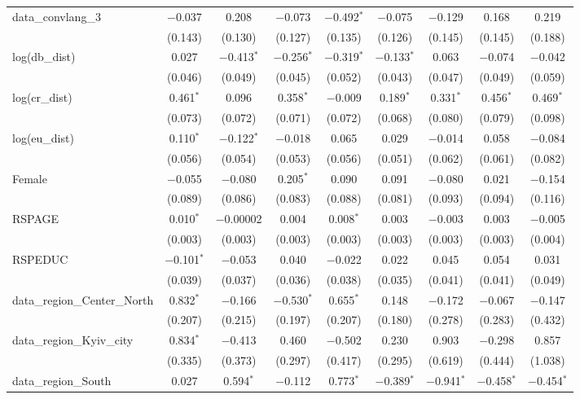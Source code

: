 \begin{table}[!htbp]
\begin{tabular}{@{\extracolsep{1pt}}lcccccccc}
  data\_convlang\_3 & $-$0.037 & 0.208 & $-$0.073 & $-$0.492$^{*}$ & $-$0.075 & $-$0.129 & 0.168 & 0.219 \\ 
  & (0.143) & (0.130) & (0.127) & (0.135) & (0.126) & (0.145) & (0.145) & (0.188) \\ 
  log(db\_dist) & 0.027 & $-$0.413$^{*}$ & $-$0.256$^{*}$ & $-$0.319$^{*}$ & $-$0.133$^{*}$ & 0.063 & $-$0.074 & $-$0.042 \\ 
  & (0.046) & (0.049) & (0.045) & (0.052) & (0.043) & (0.047) & (0.049) & (0.059) \\ 
  log(cr\_dist) & 0.461$^{*}$ & 0.096 & 0.358$^{*}$ & $-$0.009 & 0.189$^{*}$ & 0.331$^{*}$ & 0.456$^{*}$ & 0.469$^{*}$ \\ 
  & (0.073) & (0.072) & (0.071) & (0.072) & (0.068) & (0.080) & (0.079) & (0.098) \\ 
  log(eu\_dist) & 0.110$^{*}$ & $-$0.122$^{*}$ & $-$0.018 & 0.065 & 0.029 & $-$0.014 & 0.058 & $-$0.084 \\ 
  & (0.056) & (0.054) & (0.053) & (0.056) & (0.051) & (0.062) & (0.061) & (0.082) \\ 
  Female & $-$0.055 & $-$0.080 & 0.205$^{*}$ & 0.090 & 0.091 & $-$0.080 & 0.021 & $-$0.154 \\ 
  & (0.089) & (0.086) & (0.083) & (0.088) & (0.081) & (0.093) & (0.094) & (0.116) \\ 
  RSPAGE & 0.010$^{*}$ & $-$0.00002 & 0.004 & 0.008$^{*}$ & 0.003 & $-$0.003 & 0.003 & $-$0.005 \\ 
  & (0.003) & (0.003) & (0.003) & (0.003) & (0.003) & (0.003) & (0.003) & (0.004) \\ 
  RSPEDUC & $-$0.101$^{*}$ & $-$0.053 & 0.040 & $-$0.022 & 0.022 & 0.045 & 0.054 & 0.031 \\ 
  & (0.039) & (0.037) & (0.036) & (0.038) & (0.035) & (0.041) & (0.041) & (0.049) \\ 
  data\_region\_Center\_North & 0.832$^{*}$ & $-$0.166 & $-$0.530$^{*}$ & 0.655$^{*}$ & 0.148 & $-$0.172 & $-$0.067 & $-$0.147 \\ 
  & (0.207) & (0.215) & (0.197) & (0.207) & (0.180) & (0.278) & (0.283) & (0.432) \\ 
  data\_region\_Kyiv\_city & 0.834$^{*}$ & $-$0.413 & 0.460 & $-$0.502 & 0.230 & 0.903 & $-$0.298 & 0.857 \\ 
  & (0.335) & (0.373) & (0.297) & (0.417) & (0.295) & (0.619) & (0.444) & (1.038) \\ 
  data\_region\_South & 0.027 & 0.594$^{*}$ & $-$0.112 & 0.773$^{*}$ & $-$0.389$^{*}$ & $-$0.941$^{*}$ & $-$0.458$^{*}$ & $-$0.454$^{*}$ \\ 

\end{tabular}
\end{table}
